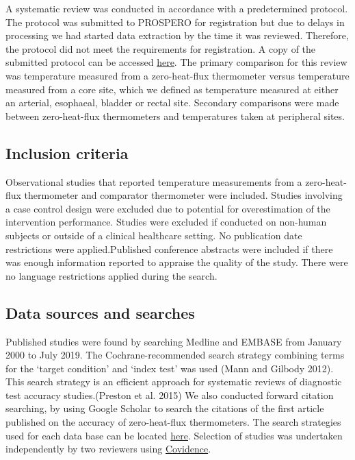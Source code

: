\documentclass[smallextended]{svjour3}       %
\begin{document}
A systematic review was conducted in accordance with a predetermined
protocol. The protocol was submitted to PROSPERO for registration but
due to delays in processing we had started data extraction by the time
it was reviewed. Therefore, the protocol did not meet the requirements
for registration. A copy of the submitted protocol can be accessed
\href{https://github.com/awconway/zhf-review}{here}. The primary
comparison for this review was temperature measured from a
zero-heat-flux thermometer versus temperature measured from a core site,
which we defined as temperature measured at either an arterial,
esophaeal, bladder or rectal site. Secondary comparisons were made
between zero-heat-flux thermometers and temperatures taken at peripheral
sites.

\hypertarget{inclusion-criteria}{%
\subsection{Inclusion criteria}\label{inclusion-criteria}}

Observational studies that reported temperature measurements from a
zero-heat-flux thermometer and comparator thermometer were included.
Studies involving a case control design were excluded due to potential
for overestimation of the intervention performance. Studies were
excluded if conducted on non-human subjects or outside of a clinical
healthcare setting. No publication date restrictions were
applied.Published conference abstracts were included if there was enough
information reported to appraise the quality of the study. There were no
language restrictions applied during the search.

\hypertarget{data-sources-and-searches}{%
\subsection{Data sources and searches}\label{data-sources-and-searches}}

Published studies were found by searching Medline and EMBASE from
January 2000 to July 2019. The Cochrane-recommended search strategy
combining terms for the `target condition' and `index test' was used
(Mann and Gilbody 2012). This search strategy is an efficient approach
for systematic reviews of diagnostic test accuracy studies.(Preston et
al. 2015) We also conducted forward citation searching, by using Google
Scholar to search the citations of the first article published on the
accuracy of zero-heat-flux thermometers. The search strategies used for
each data base can be located \href{shiny\%20app}{here}. Selection of
studies was undertaken independently by two reviewers using
\href{https://www.covidence.org}{Covidence}.
\end{document}
